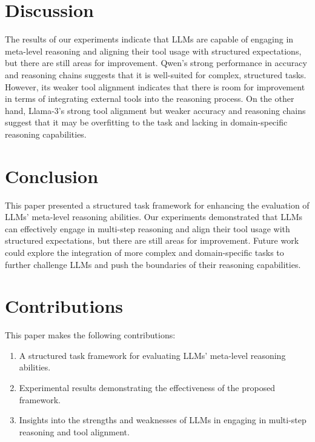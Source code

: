 \documentclass[12pt]{article}
\begin{document}
\section{Discussion}
The results of our experiments indicate that LLMs are capable of engaging in meta-level reasoning and aligning their tool usage with structured expectations, but there are still areas for improvement. Qwen's strong performance in accuracy and reasoning chains suggests that it is well-suited for complex, structured tasks. However, its weaker tool alignment indicates that there is room for improvement in terms of integrating external tools into the reasoning process. On the other hand, Llama-3's strong tool alignment but weaker accuracy and reasoning chains suggest that it may be overfitting to the task and lacking in domain-specific reasoning capabilities.

\section{Conclusion}
This paper presented a structured task framework for enhancing the evaluation of LLMs' meta-level reasoning abilities. Our experiments demonstrated that LLMs can effectively engage in multi-step reasoning and align their tool usage with structured expectations, but there are still areas for improvement. Future work could explore the integration of more complex and domain-specific tasks to further challenge LLMs and push the boundaries of their reasoning capabilities.

\section{Contributions}
This paper makes the following contributions:
\begin{enumerate}
    \item A structured task framework for evaluating LLMs' meta-level reasoning abilities.
    \item Experimental results demonstrating the effectiveness of the proposed framework.
    \item Insights into the strengths and weaknesses of LLMs in engaging in multi-step reasoning and tool alignment.
\end{enumerate}
\end{document}
